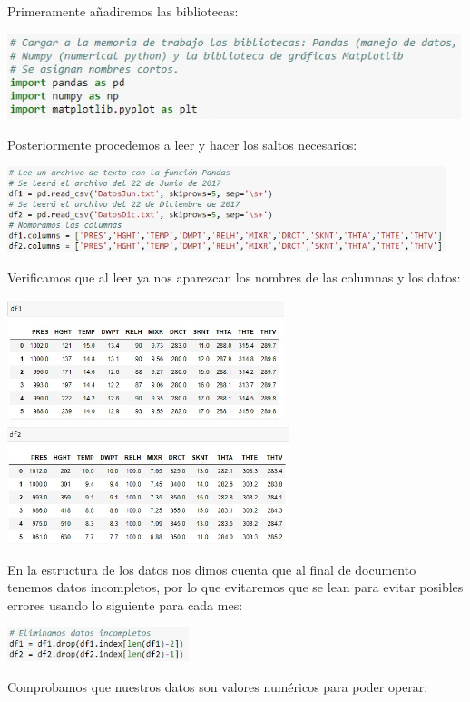 \documentclass[12pt]{article}
\begin{document}
Primeramente añadiremos las bibliotecas:
\begin{center}
	\includegraphics[height=2.5cm]{Bibliotecas.jpg}
\end{center}
Posteriormente procedemos a leer y hacer los saltos necesarios:
\begin{center}
	\includegraphics[height=2.5cm]{Lectura.jpg}
\end{center}
Verificamos que al leer ya nos aparezcan los nombres de las columnas y los datos:
\begin{center}
	\includegraphics[height=3.5cm]{DatJ.jpg}
    \includegraphics[height=3.5cm]{DatD.jpg}
\end{center}
En la estructura de los datos nos dimos cuenta que al final de documento tenemos datos incompletos, por lo que evitaremos que se lean para evitar posibles errores usando lo siguiente para cada mes:
\begin{center}
	\includegraphics[height=1cm]{Eliminados.jpg}
\end{center}
Comprobamos que nuestros datos son valores numéricos para poder operar:
\end{document}
